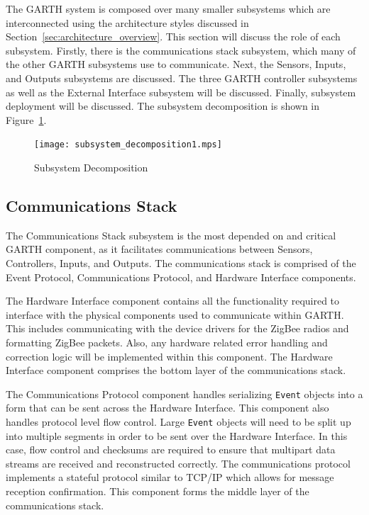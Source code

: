 \documentclass{report}
\begin{document}

The GARTH system is composed over many smaller subsystems which are
interconnected using the architecture styles discussed in
Section~\ref{sec:architecture_overview}. This section will discuss the
role of each subsystem. Firstly, there is the communications stack
subsystem, which many of the other GARTH subsystems use to
communicate. Next, the Sensors, Inputs, and Outputs subsystems are
discussed. The three GARTH controller subsystems as well as the
External Interface subsystem will be discussed. Finally, subsystem
deployment will be discussed. The subsystem decomposition is shown in
Figure~\ref{fig:subsystem_decomposition}.

\begin{figure}[hp]
    \centering
        \caption{Subsystem Decomposition}
        \scriptsize
        \setlength{\unitlength}{2.0em}
        \texttt{[image: subsystem\_decomposition1.mps]}
        \normalsize
    \label{fig:subsystem_decomposition}
\end{figure}

\subsection{Communications Stack}

The Communications Stack subsystem is the most depended on and critical
GARTH component, as it facilitates communications between Sensors,
Controllers, Inputs, and Outputs. The communications stack is
comprised of the Event Protocol, Communications Protocol, and Hardware
Interface components.

The Hardware Interface component contains all the
functionality required to interface with the physical components used
to communicate within GARTH. This includes communicating with the
device drivers for the ZigBee radios and formatting ZigBee packets.
Also, any hardware related error handling and correction logic will be
implemented within this component. The Hardware Interface component
comprises the bottom layer of the communications stack.

The Communications Protocol component handles serializing \texttt{Event}
objects into a form that can be sent across the Hardware
Interface. This component also handles protocol level flow
control. Large \texttt{Event} objects will need to be split up into multiple
segments in order to be sent over the Hardware Interface. In this
case, flow control and checksums are required to ensure that multipart
data streams are received and reconstructed correctly. The
communications protocol implements a stateful protocol similar to
TCP/IP which allows for message reception confirmation. This component
forms the middle layer of the communications stack.
\end{document}
